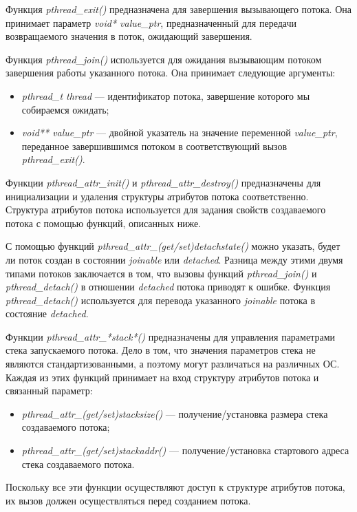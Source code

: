 Функция \textit{pthread\_exit()} предназначена для завершения вызывающего потока.
Она принимает параметр \textit{void* value\_ptr}, предназначенный для передачи
возвращаемого значения в поток, ожидающий завершения.

Функция \textit{pthread\_join()} используется для ожидания вызывающим потоком
завершения работы указанного потока. Она принимает следующие аргументы:
\begin{itemize}
  \item \textit{pthread\_t thread} --- идентификатор потока,
    завершение которого мы собираемся ожидать;
  \item \textit{void** value\_ptr} --- двойной указатель на значение переменной
    \textit{value\_ptr}, переданное завершившимся потоком в
    соответствующий вызов \textit{pthread\_exit()}.
\end{itemize}

Функции \textit{pthread\_attr\_init()} и \textit{pthread\_attr\_destroy()}
предназначены для инициализации и удаления структуры атрибутов
потока соответственно. Структура атрибутов потока используется для
задания свойств создаваемого потока с помощью функций, описанных ниже.

С помощью функций \textit{pthread\_attr\_(get/set)detachstate()} можно указать,
будет ли поток создан в состоянии \textit{joinable} или \textit{detached}.
Разница между этими двумя типами потоков заключается в том,
что вызовы функций \textit{pthread\_join()} и \textit{pthread\_detach()}
в отношении \textit{detached} потока приводят к ошибке.
Функция \textit{pthread\_detach()} используется для перевода указанного \textit{joinable}
потока в состояние \textit{detached}.

Функции \textit{pthread\_attr\_*stack*()} предназначены для управления
параметрами стека запускаемого потока. Дело в том, что значения параметров стека
не являются стандартизованными, а поэтому могут различаться на различных ОС.
Каждая из этих функций принимает на вход структуру атрибутов потока и связанный параметр:
\begin{itemize}
  \item \textit{pthread\_attr\_(get/set)stacksize()} --- получение/установка размера стека
    создаваемого потока;
  \item \textit{pthread\_attr\_(get/set)stackaddr()} --- получение/установка стартового адреса
    стека создаваемого потока.
\end{itemize}

Поскольку все эти функции осуществляют доступ к структуре
атрибутов потока, их вызов должен осуществляться перед созданием потока.

